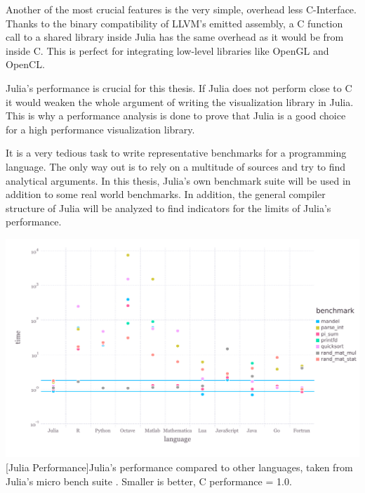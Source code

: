 Another of the most crucial features is the very simple, overhead less C-Interface. 
Thanks to the binary compatibility of \ac{LLVM}'s emitted assembly, a C function call to a shared library inside Julia has the same overhead as it would be from inside C\cite{CCALL}. 
This is perfect for integrating low-level libraries like \ac{OpenGL} and \ac{OpenCL}.

Julia's performance is crucial for this thesis. 
If Julia does not perform close to C it would weaken the whole argument of writing the visualization library in Julia.
This is why a performance analysis is done to prove that Julia is a good choice for a high performance visualization library.

It is a very tedious task to write representative benchmarks for a programming language. 
The only way out is to rely on a multitude of sources and try to find analytical arguments.
In this thesis, Julia's own benchmark suite will be used in addition to some real world benchmarks.
In addition, the general compiler structure of Julia will be analyzed to find indicators for the limits of Julia's performance.

\vspace{1em}
\begin{minipage}{\linewidth}
    \centering
    \includegraphics[width=0.9\linewidth]{graphics/juliabench.pdf}
    [Julia Performance]{Julia's performance compared to other languages, taken from Julia's micro bench suite \cite{JuliaBench}. Smaller is better, C performance = 1.0.}
    \label{fig:juliabench}
\end{minipage}

